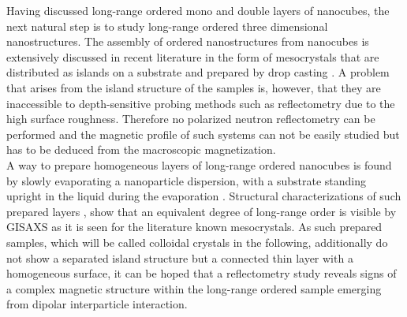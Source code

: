 \documentclass[\main/dresen_thesis.tex]{subfiles}
\begin{document}
  Having discussed long-range ordered mono and double layers of nanocubes, the next natural step is to study long-range ordered three dimensional nanostructures.
  The assembly of ordered nanostructures from nanocubes is extensively discussed in recent literature in the form of mesocrystals that are distributed as islands on a substrate and prepared by drop casting \cite{Wetterskog_2016_Tunin, Agthe_2017_Follo, Josten_2017_Super, Disch_2011_Shape}.
  A problem that arises from the island structure of the samples is, however, that they are inaccessible to depth-sensitive probing methods such as reflectometry due to the high surface roughness.
  Therefore no polarized neutron reflectometry can be performed and the magnetic profile of such systems can not be easily studied but has to be deduced from the macroscopic magnetization.
  \\

  A way to prepare homogeneous layers of long-range ordered nanocubes is found by slowly evaporating a nanoparticle dispersion, with a substrate standing upright in the liquid during the evaporation \cite{Wichmann_2016_Synth}.
  Structural characterizations of such prepared layers \cite{Wichmann_2016_Synth}, show that an equivalent degree of long-range order is visible by GISAXS as it is seen for the literature known mesocrystals.
  As such prepared samples, which will be called colloidal crystals in the following, additionally do not show a separated island structure but a connected thin layer with a homogeneous surface, it can be hoped that a reflectometry study reveals signs of a complex magnetic structure within the long-range ordered sample emerging from dipolar interparticle interaction.
\end{document}
